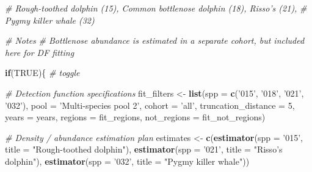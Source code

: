 \documentclass[
]{book}
\newenvironment{Shaded}{\begin{snugshade}}{\end{snugshade}}
\newcommand{\CommentTok}[1]{\textcolor[rgb]{0.56,0.35,0.01}{\textit{#1}}}
\newcommand{\ControlFlowTok}[1]{\textcolor[rgb]{0.13,0.29,0.53}{\textbf{#1}}}
\newcommand{\DataTypeTok}[1]{\textcolor[rgb]{0.13,0.29,0.53}{#1}}
\newcommand{\DecValTok}[1]{\textcolor[rgb]{0.00,0.00,0.81}{#1}}
\newcommand{\KeywordTok}[1]{\textcolor[rgb]{0.13,0.29,0.53}{\textbf{#1}}}
\newcommand{\NormalTok}[1]{#1}
\newcommand{\OtherTok}[1]{\textcolor[rgb]{0.56,0.35,0.01}{#1}}
\newcommand{\StringTok}[1]{\textcolor[rgb]{0.31,0.60,0.02}{#1}}
\begin{document}
\begin{Shaded}
\begin{Highlighting}[]
\CommentTok{# Rough-toothed dolphin (15), Common bottlenose dolphin (18), Risso's (21),}
\CommentTok{# Pygmy killer whale (32)}

\CommentTok{# Notes}
\CommentTok{# Bottlenose abundance is estimated in a separate cohort, but included here for DF fitting}

\ControlFlowTok{if}\NormalTok{(}\OtherTok{TRUE}\NormalTok{)\{ }\CommentTok{# toggle}

  \CommentTok{# Detection function specifications}
\NormalTok{  fit_filters <-}
\StringTok{    }\KeywordTok{list}\NormalTok{(}\DataTypeTok{spp =} \KeywordTok{c}\NormalTok{(}\StringTok{'015'}\NormalTok{, }\StringTok{'018'}\NormalTok{, }\StringTok{'021'}\NormalTok{, }\StringTok{'032'}\NormalTok{),}
         \DataTypeTok{pool =} \StringTok{'Multi-species pool 2'}\NormalTok{,}
         \DataTypeTok{cohort =} \StringTok{'all'}\NormalTok{,}
         \DataTypeTok{truncation_distance =} \DecValTok{5}\NormalTok{,}
         \DataTypeTok{years =}\NormalTok{ years,}
         \DataTypeTok{regions =}\NormalTok{ fit_regions,}
         \DataTypeTok{not_regions =}\NormalTok{ fit_not_regions)}

  \CommentTok{# Density / abundance estimation plan}
\NormalTok{  estimates <-}
\StringTok{      }\KeywordTok{c}\NormalTok{(}\KeywordTok{estimator}\NormalTok{(}\DataTypeTok{spp =} \StringTok{'015'}\NormalTok{, }\DataTypeTok{title =} \StringTok{"Rough-toothed dolphin"}\NormalTok{),}
        \KeywordTok{estimator}\NormalTok{(}\DataTypeTok{spp =} \StringTok{'021'}\NormalTok{, }\DataTypeTok{title =} \StringTok{"Risso's dolphin"}\NormalTok{),}
        \KeywordTok{estimator}\NormalTok{(}\DataTypeTok{spp =} \StringTok{'032'}\NormalTok{, }\DataTypeTok{title =} \StringTok{"Pygmy killer whale"}\NormalTok{))}


\end{Highlighting}
\end{Shaded}
\end{document}
